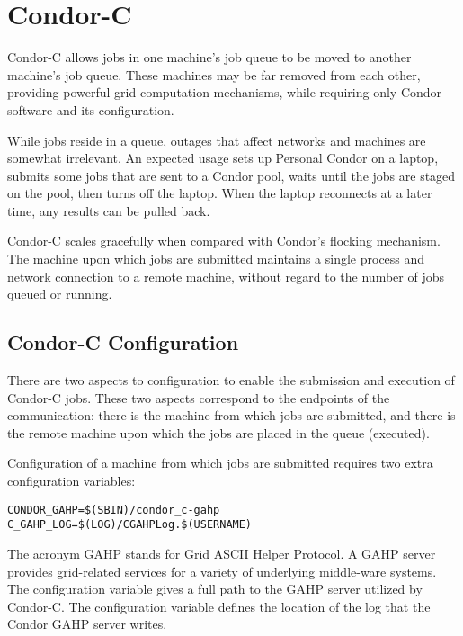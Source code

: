 
\section{\label{sec:Condor-C}Condor-C}

Condor-C allows jobs in one machine's job queue to
be moved to another machine's job queue.
These machines may be far removed from each other,
providing powerful grid computation mechanisms,
while requiring only Condor software and its configuration.

While jobs reside in a queue,
outages that affect networks and machines are somewhat
irrelevant.
An expected usage
sets up Personal Condor on a laptop,
submits some jobs that are sent to a Condor pool,
waits until the jobs are staged on the pool,
then turns off the laptop.
When the laptop reconnects at a later time,
any results can be pulled back.

Condor-C scales gracefully when compared with Condor's flocking
mechanism.
The machine upon which jobs are submitted
maintains a single process and network connection to a remote machine,
without regard to the number
of jobs queued or running.

\subsection{\label{sec:Condor-C-Config}Condor-C Configuration}
There are two aspects to configuration to enable the
submission and execution of Condor-C jobs.
These two aspects correspond to the endpoints of the 
communication: there is the machine from which jobs are
submitted, and there is the remote machine upon which the
jobs are placed in the queue (executed).

Configuration of a machine from which jobs are submitted
requires two extra configuration variables:

\footnotesize
\begin{verbatim}
CONDOR_GAHP=$(SBIN)/condor_c-gahp
C_GAHP_LOG=$(LOG)/CGAHPLog.$(USERNAME)
\end{verbatim}
\normalsize

The acronym GAHP stands for Grid ASCII Helper Protocol.
A GAHP server provides grid-related services for a
variety of underlying middle-ware systems.
The configuration variable 
gives a full path to the GAHP server utilized by Condor-C.
The configuration variable  defines
the location of the log that the Condor GAHP server writes.

